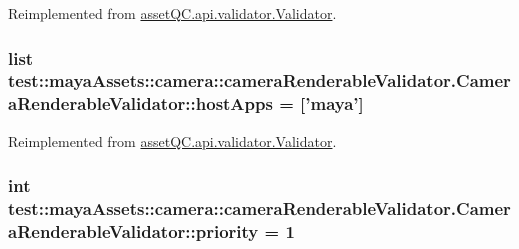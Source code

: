 \-Reimplemented from \hyperlink{classassetQC_1_1api_1_1validator_1_1Validator_a4cc8fea6a18bf60b0cc7a6a23c211850}{asset\-Q\-C.\-api.\-validator.\-Validator}.

\hypertarget{classtest_1_1mayaAssets_1_1camera_1_1cameraRenderableValidator_1_1CameraRenderableValidator_a7341592735355c7f6b25533620e1af3c}{
\subsubsection[{host\-Apps}]{\setlength{\rightskip}{0pt plus 5cm}list {\bf test\-::maya\-Assets\-::camera\-::camera\-Renderable\-Validator.\-Camera\-Renderable\-Validator\-::host\-Apps} = \mbox{[}'maya'\mbox{]}}}\label{d2/d2c/classtest_1_1mayaAssets_1_1camera_1_1cameraRenderableValidator_1_1CameraRenderableValidator_a7341592735355c7f6b25533620e1af3c}


\-Reimplemented from \hyperlink{classassetQC_1_1api_1_1validator_1_1Validator_a3a61440b99b6a8cf93bc45201ae6198c}{asset\-Q\-C.\-api.\-validator.\-Validator}.

\hypertarget{classtest_1_1mayaAssets_1_1camera_1_1cameraRenderableValidator_1_1CameraRenderableValidator_af0af9d27ff8eb889c6da8dc79b23e9ca}{
\subsubsection[{priority}]{\setlength{\rightskip}{0pt plus 5cm}int {\bf test\-::maya\-Assets\-::camera\-::camera\-Renderable\-Validator.\-Camera\-Renderable\-Validator\-::priority} = 1}}\label{d2/d2c/classtest_1_1mayaAssets_1_1camera_1_1cameraRenderableValidator_1_1CameraRenderableValidator_af0af9d27ff8eb889c6da8dc79b23e9ca}


